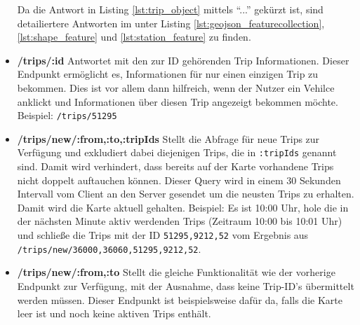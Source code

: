 \begin{itemize}[label={}]
    Da die Antwort in Listing \ref{lst:trip_object} mittels "`..."' gekürzt ist, sind detailiertere Antworten im  unter Listing \ref{lst:geojson_featurecollection}, \ref{lst:shape_feature} und \ref{lst:station_feature} zu finden.
  

    \item \textbf{/trips/:id} Antwortet mit den zur ID gehörenden Trip Informationen. Dieser Endpunkt ermöglicht es, Informationen für nur einen einzigen Trip zu bekommen. Dies ist vor allem dann hilfreich, wenn der Nutzer ein Vehilce anklickt und Informationen über diesen Trip angezeigt bekommen möchte. Beispiel: \texttt{/trips/51295}

    \item \textbf{/trips/new/:from,:to,:tripIds} Stellt die Abfrage für neue Trips zur Verfügung und exkludiert dabei diejenigen Trips, die in \texttt{:tripIds} genannt sind. Damit wird verhindert, dass bereits auf der Karte vorhandene Trips nicht doppelt auftauchen können. Dieser Query wird in einem 30 Sekunden Intervall vom Client an den Server gesendet um die neusten Trips zu erhalten. Damit wird die Karte aktuell gehalten. Beispiel: Es ist 10:00 Uhr, hole die in der nächsten Minute aktiv werdenden Trips (Zeitraum 10:00 bis 10:01 Uhr) und schließe die Trips mit der ID \texttt{51295,9212,52} vom Ergebnis aus \texttt{/trips/new/36000,36060,51295,9212,52}.

    \item \textbf{/trips/new/:from,:to} Stellt die gleiche Funktionalität wie der vorherige Endpunkt zur Verfügung, mit der Ausnahme, dass keine Trip-ID's übermittelt werden müssen. Dieser Endpunkt ist beispielsweise dafür da, falls die Karte leer ist und noch keine aktiven Trips enthält.

  \end{itemize}

